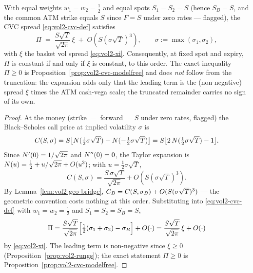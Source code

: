 \begin{proposition}
\label{prop:vol2-cvc-xi}
With equal weights $w_1 = w_2 = \tfrac12$ and equal spots $S_1 = S_2 = S$
(hence $S_B = S$, and the common ATM strike equals $S$ since $F = S$ under
zero rates --- flagged), the CVC spread \eqref{eq:vol2-cvc-def} satisfies
\begin{equation}
\boxed{\;\Pi \;=\; \frac{S\sqrt{T}}{\sqrt{2\pi}}\,\xi
       \;+\; O\!\left(S(\sigma\sqrt{T})^3\right),
       \qquad \sigma := \max(\sigma_1, \sigma_2),\;}
\label{eq:vol2-cvc-xi}
\end{equation}
with $\xi$ the basket vol spread \eqref{eq:vol2-xi}. Consequently, at fixed
spot and expiry, $\Pi$ is constant if and only if $\xi$ is constant, to this
order. The exact inequality $\Pi \ge 0$ is
Proposition~\ref{prop:vol2-cvc-modelfree} and does \emph{not} follow from
the truncation: the expansion adds only that the leading term is the
(non-negative) spread $\xi$ times the ATM cash-vega scale; the truncated
remainder carries no sign of its own.
\end{proposition}

\begin{proof}
At the money (strike $=$ forward $= S$ under zero rates, flagged) the
Black--Scholes call price at implied volatility $\sigma$ is
\[
C(S, \sigma)
 = S\bigl[N(\tfrac12\sigma\sqrt{T}) - N(-\tfrac12\sigma\sqrt{T})\bigr]
 = S\bigl[2\,N(\tfrac12\sigma\sqrt{T}) - 1\bigr].
\]
Since $N'(0) = 1/\sqrt{2\pi}$ and $N''(0) = 0$, the Taylor expansion
is $N(u) = \tfrac12 + u/\sqrt{2\pi} + O(u^3)$; with
$u = \tfrac12\sigma\sqrt{T}$,
\[
C(S, \sigma) = \frac{S\,\sigma\sqrt{T}}{\sqrt{2\pi}}
             + O\!\left(S(\sigma\sqrt{T})^3\right).
\]
By Lemma~\ref{lem:vol2-geo-bridge}, $C_B = C(S, \sigma_B) +
O(S(\sigma\sqrt{T})^3)$ --- the geometric convention costs nothing at this
order. Substituting into \eqref{eq:vol2-cvc-def} with $w_1 = w_2 = \tfrac12$
and $S_1 = S_2 = S_B = S$,
\[
\Pi = \frac{S\sqrt{T}}{\sqrt{2\pi}}
      \Bigl[\tfrac12(\sigma_1 + \sigma_2) - \sigma_B\Bigr] + O(\cdot)
    = \frac{S\sqrt{T}}{\sqrt{2\pi}}\,\xi + O(\cdot)
\]
by \eqref{eq:vol2-xi}. The leading term is non-negative since $\xi \ge 0$
(Proposition~\ref{prop:vol2-rungs}); the exact statement $\Pi \ge 0$ is
Proposition~\ref{prop:vol2-cvc-modelfree}.
\end{proof}


